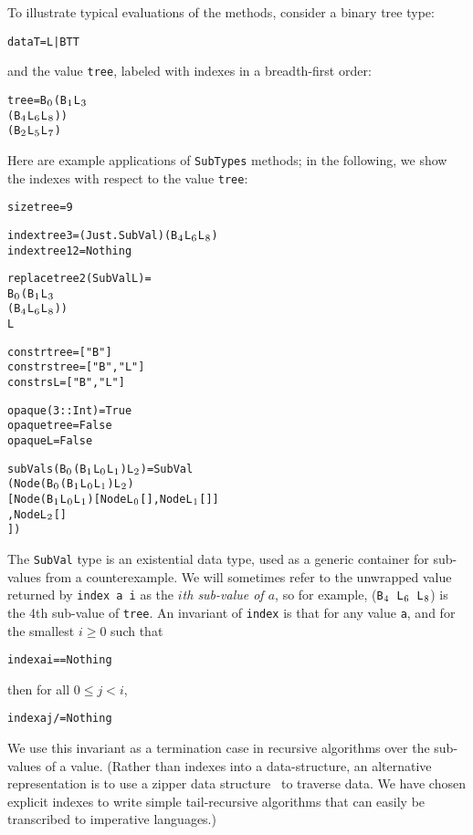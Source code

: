\documentclass{sigplanconf}
\newenvironment{code}{\begin{alltt}\footnotesize}{\end{alltt}}
\newcommand{\ttp}[1]{\texttt{#1}}
\newcommand{\sub}[1]{\(\sb{#1}\)}
\begin{document}
\noindent
To illustrate typical evaluations of the methods, consider a binary tree type:
%
\begin{code}
data T = L | B T T
\end{code}
%
\noindent
and the value \ttp{tree}, labeled with indexes in a breadth-first order:
%
\begin{code}
tree = B\sub{0} (B\sub{1} L\sub{3}
             (B\sub{4} L\sub{6} L\sub{8}))
          (B\sub{2} L\sub{5} L\sub{7})
\end{code}
%
\noindent
Here are example applications of \ttp{SubTypes} methods; in the following, we
show the indexes with respect to the value \ttp{tree}:
%
\begin{code}
size tree = 9

index tree 3  = (Just . SubVal) (B\sub{4} L\sub{6} L\sub{8})
index tree 12 = Nothing

replace tree 2 (SubVal L) =
  B\sub{0} (B\sub{1} L\sub{3}
        (B\sub{4} L\sub{6} L\sub{8}))
     L

constr  tree = ["B"]
constrs tree = ["B", "L"]
constrs L    = ["B", "L"]

opaque (3 :: Int) = True
opaque tree       = False
opaque L          = False

subVals (B\sub{0} (B\sub{1} L\sub{0} L\sub{1}) L\sub{2}) = SubVal
  (Node (B\sub{0} (B\sub{1} L\sub{0} L\sub{1}) L\sub{2})
        [ Node (B\sub{1} L\sub{0} L\sub{1}) [Node L\sub{0} [], Node L\sub{1} []]
        , Node L\sub{2} []
        ])
\end{code}
%
\noindent
The \ttp{SubVal} type is an existential data type, used as a generic container
for sub-values from a counterexample.  We will sometimes refer to the unwrapped
value returned by \ttp{index a i} as the \emph{$i$th sub-value of $a$}, so for
example, (\ttp{B\sub{4} L\sub{6} L\sub{8}}) is the 4th sub-value of \ttp{tree}.
An invariant of \ttp{index} is that for any value \ttp{a}, and for the smallest
$i \geq 0$ such that
%
\begin{code}
index a i == Nothing
\end{code}
%
\noindent
then for all $0 \leq j < i$,
%
\begin{code}
index a j /= Nothing
\end{code}
\noindent
We use this invariant as a termination case in recursive algorithms over the
sub-values of a value.  (Rather than indexes into a data-structure, an
alternative representation is to use a zipper data structure~\cite{zipper} to
traverse data.  We have chosen explicit indexes to write simple tail-recursive
algorithms that can easily be transcribed to imperative languages.)
\end{document}
